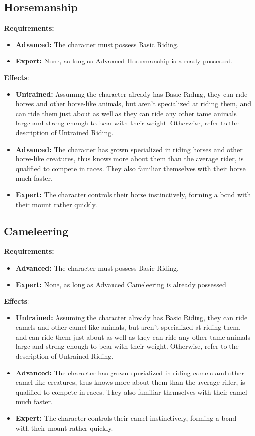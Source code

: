 \documentclass[openany,10pt,a4paper]{book}
\begin{document}
\subsection{Horsemanship}
\textbf{Requirements:}
\begin{itemize}
	\item \textbf{Advanced:} The character must possess Basic Riding.
	\item \textbf{Expert:} None, as long as Advanced Horsemanship is already possessed.
\end{itemize}
\textbf{Effects:}
\begin{itemize}
	\item \textbf{Untrained:} Assuming the character already has Basic Riding, they can ride horses and other horse-like animals, but aren't specialized at riding them, and can ride them just about as well as they can ride any other tame animals large and strong enough to bear with their weight. Otherwise, refer to the description of Untrained Riding.
	\item \textbf{Advanced:} The character has grown specialized in riding horses and other horse-like creatures, thus knows more about them than the average rider, is qualified to compete in races. They also familiar themselves with their horse much faster.
	\item \textbf{Expert:} The character controls their horse instinctively, forming a bond with their mount rather quickly.
\end{itemize}
\subsection{Cameleering}
\textbf{Requirements:}
\begin{itemize}
	\item \textbf{Advanced:} The character must possess Basic Riding.
	\item \textbf{Expert:} None, as long as Advanced Cameleering is already possessed.
\end{itemize}
\textbf{Effects:}
\begin{itemize}
	\item \textbf{Untrained:} Assuming the character already has Basic Riding, they can ride camels and other camel-like animals, but aren't specialized at riding them, and can ride them just about as well as they can ride any other tame animals large and strong enough to bear with their weight. Otherwise, refer to the description of Untrained Riding.
	\item \textbf{Advanced:} The character has grown specialized in riding camels and other camel-like creatures, thus knows more about them than the average rider, is qualified to compete in races. They also familiar themselves with their camel much faster.
	\item \textbf{Expert:} The character controls their camel instinctively, forming a bond with their mount rather quickly.
\end{itemize}
\end{document}
